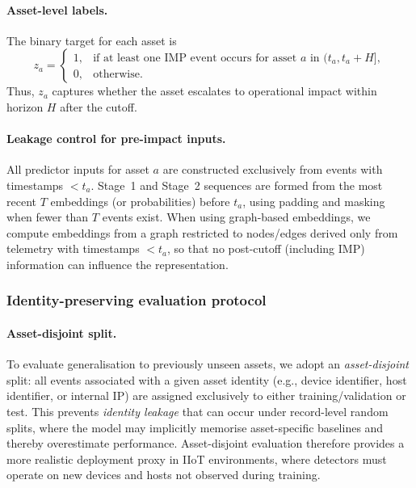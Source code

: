 \documentclass[pdflatex,sn-mathphys-num]{sn-jnl}
\theoremstyle{thmstyleone}%
\theoremstyle{thmstyletwo}%
\theoremstyle{thmstylethree}%
\begin{document}
\paragraph{Asset-level labels.}
The binary target for each asset is
\begin{equation}
z_a =
\begin{cases}
1, & \text{if at least one IMP event occurs for asset $a$ in } (t_a, t_a+H],\\
0, & \text{otherwise}.
\end{cases}
\end{equation}
Thus, $z_a$ captures whether the asset escalates to operational impact within horizon $H$ after the cutoff.

\paragraph{Leakage control for pre-impact inputs.}
All predictor inputs for asset $a$ are constructed exclusively from events with timestamps $<t_a$.
Stage~1 and Stage~2 sequences are formed from the most recent $T$ embeddings (or probabilities) before $t_a$,
using padding and masking when fewer than $T$ events exist.
When using graph-based embeddings, we compute embeddings from a graph restricted to nodes/edges derived only from
telemetry with timestamps $<t_a$, so that no post-cutoff (including IMP) information can influence the representation.

\subsubsection{Identity-preserving evaluation protocol}
\label{subsubsec:identity_preserving_eval}

\paragraph{Asset-disjoint split.}
To evaluate generalisation to previously unseen assets, we adopt an \emph{asset-disjoint} split: all events
associated with a given asset identity (e.g., device identifier, host identifier, or internal IP) are assigned
exclusively to either training/validation or test.
This prevents \emph{identity leakage} that can occur under record-level random splits, where the model may implicitly
memorise asset-specific baselines and thereby overestimate performance.
Asset-disjoint evaluation therefore provides a more realistic deployment proxy in IIoT environments, where detectors
must operate on new devices and hosts not observed during training.
\end{document}
